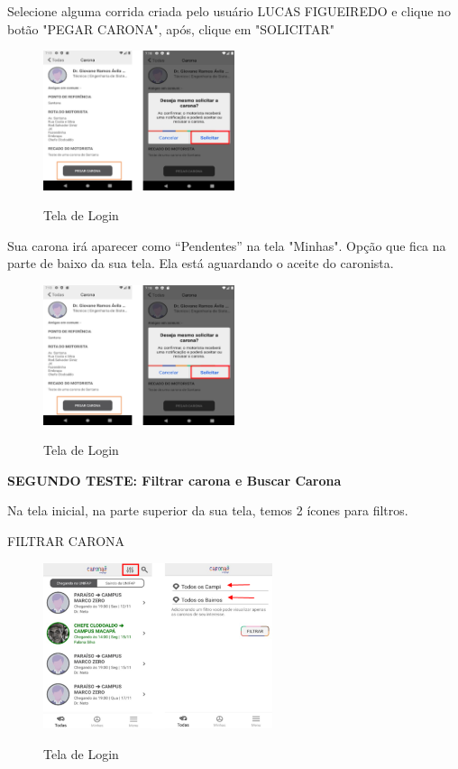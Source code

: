 Selecione alguma corrida criada pelo usuário LUCAS FIGUEIREDO e clique no botão
"PEGAR CARONA", após, clique em "SOLICITAR"

\begin{figure}[H]
	\centering
	\caption{Tela de Login}
	\includegraphics[width=0.5\textwidth]{./04-figuras/manual/solicitacao_de_carona.png}
	\label{fig:solicitacao_de_carona}
\end{figure}

Sua carona irá aparecer como “Pendentes” na tela "Minhas". Opção que fica na parte de baixo da sua tela. Ela está aguardando o aceite do caronista.

\begin{figure}[H]
	\centering
	\caption{Tela de Login}
	\includegraphics[width=0.5\textwidth]{./04-figuras/manual/solicitacao_de_carona.png}
	\label{fig:solicitacao_de_carona_2}
\end{figure}

\textbf{SEGUNDO TESTE: Filtrar carona e Buscar Carona}

Na tela inicial, na parte superior da sua tela, temos 2 ícones para filtros.

FILTRAR CARONA

\begin{figure}[H]
	\centering
	\caption{Tela de Login}
	\includegraphics[width=0.6\textwidth]{./04-figuras/manual/filtrar_carona.png}
	\label{fig:filtrar_carona}
\end{figure}

